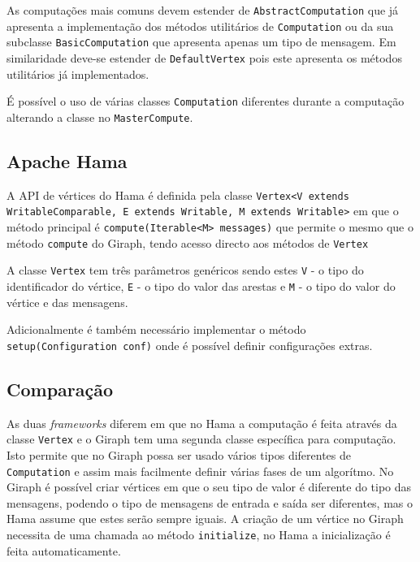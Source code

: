 As computações mais comuns devem estender de \texttt{AbstractComputation} que já apresenta a implementação dos métodos utilitários de \texttt{Computation} ou da sua subclasse \texttt{BasicComputation} que apresenta apenas um tipo de mensagem.
Em similaridade deve-se estender de \texttt{DefaultVertex} pois este apresenta os métodos utilitários já implementados.

É possível o uso de várias classes \texttt{Computation} diferentes durante a computação alterando a classe no \texttt{MasterCompute}.

\subsection*{Apache Hama}
A API de vértices do Hama é definida pela classe \texttt{Vertex<V extends WritableComparable, E extends Writable, M extends Writable>} em que o método principal é \texttt{compute(Iterable<M> messages)} que permite o mesmo que o método \texttt{compute} do Giraph, tendo acesso directo aos métodos de \texttt{Vertex}

A classe \texttt{Vertex} tem três parâmetros genéricos sendo estes \texttt{V} - o tipo do identificador do vértice, \texttt{E} - o tipo do valor das arestas e \texttt{M} - o tipo do valor do vértice e das mensagens.


Adicionalmente é também necessário implementar o método \texttt{setup(Configuration conf)} onde é possível definir configurações extras.
\subsection*{Comparação}


As duas \textit{frameworks} diferem em que no Hama a computação é feita através da classe \texttt{Vertex} e o Giraph tem uma segunda classe específica para computação. Isto permite que no Giraph possa ser usado vários tipos diferentes de \texttt{Computation} e assim mais facilmente definir várias fases de um algorítmo.
No Giraph é possível criar vértices em que o seu tipo de valor é diferente do tipo das mensagens, podendo o tipo de mensagens de entrada e saída ser diferentes, mas o Hama assume que estes serão sempre iguais. A criação de um vértice no Giraph necessita de uma chamada ao método \texttt{initialize}, no Hama a inicialização é feita automaticamente.